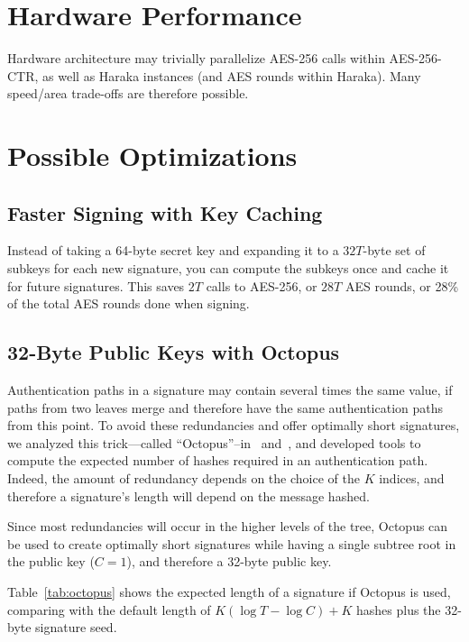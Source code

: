 \section{Hardware Performance}

Hardware architecture may trivially parallelize AES-256 calls within AES-256-CTR, as well as Haraka instances (and AES rounds within Haraka).
Many speed/area trade-offs are therefore possible.


\section{Possible Optimizations}

\subsection{Faster Signing with Key Caching}\label{ssec:cache}

Instead of taking a 64-byte secret key and expanding it to a $32T$-byte set of subkeys for each new signature, you can compute the subkeys once and cache it for future signatures. 
This saves $2T$ calls to AES-256, or $28T$ AES rounds, or 28\% of the total AES rounds done when signing.


\subsection{32-Byte Public Keys with Octopus}

Authentication paths in a signature may contain several times the same value, if paths from two leaves merge and therefore have the same authentication paths from this point.
To avoid these redundancies and offer optimally short signatures, we analyzed this trick---called ``Octopus''--in~\cite[Ch.5]{masters} and~\cite[\S3.5]{improving}, and developed tools to compute the expected number of hashes required in an authentication path.
Indeed, the amount of redundancy depends on the choice of the $K$ indices, and therefore a signature's length will depend on the message hashed.

Since most redundancies will occur in the higher levels of the tree, Octopus can be used to create optimally short signatures while having a single subtree root in the public key ($C=1$), and therefore a 32-byte public key.

Table~\ref{tab:octopus} shows the expected length of a signature if Octopus is used, comparing with the default length of $K(\log T - \log C)+K$ hashes plus the 32-byte signature seed.

